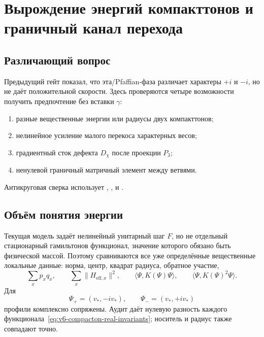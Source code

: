 \chapter{Вырождение энергий компакттонов и граничный канал перехода}
\label{ch:v6-spectral-transition-discrete-compacton-energy-degeneracy-boundary-overlap-gate}

\section{Различающий вопрос}

Предыдущий гейт показал, что эта/Pfaffian-фаза различает характеры
$+i$ и $-i$, но не даёт положительной скорости. Здесь проверяются четыре
возможности получить предпочтение без вставки $\gamma$:
\begin{enumerate}
 \item разные вещественные энергии или радиусы двух компакттонов;
 \item нелинейное усиление малого перекоса характерных весов;
 \item градиентный сток дефекта $D_\chi$ после проекции $P_3$;
 \item ненулевой граничный матричный элемент между ветвями.
\end{enumerate}

Антикруговая сверка использует
,
,
и
.

\section{Объём понятия энергии}

Текущая модель задаёт нелинейный унитарный шаг $F$, но не отдельный
стационарный гамильтонов функционал, значение которого обязано быть
физической массой. Поэтому сравниваются все уже определённые вещественные
локальные данные: норма, центр, квадрат радиуса, обратное участие,
\begin{equation}
 \sum_x p_xq_x,
 \qquad
 \sum_x\|H_{\mathrm{eff},x}\|^2,
 \qquad
 \langle\Psi,K(\Psi)\Psi\rangle,
 \qquad
 \langle\Psi,K(\Psi)^2\Psi\rangle.
 \label{eq:v6-compacton-real-invariants}
\end{equation}
Для
\begin{equation}
 \Psi_+=(v_*,-iv_*),
 \qquad
 \Psi_-=(v_*,+iv_*)
 \label{eq:v6-compacton-conjugate-branches}
\end{equation}
профили комплексно сопряжены. Аудит даёт нулевую разность каждого
функционала~\eqref{eq:v6-compacton-real-invariants}; носитель и радиус
также совпадают точно.

